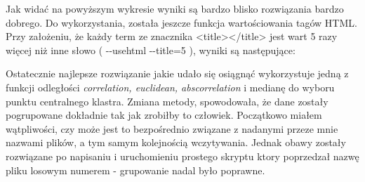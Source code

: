 \documentclass{article}
\begin{document}
\begin{center}
\end{center}

Jak widać na powyższym wykresie wyniki są bardzo blisko rozwiązania bardzo dobrego. Do wykorzystania, została jeszcze funkcja wartościowania tagów HTML. Przy założeniu, że każdy term ze znacznika <title></title> jest wart 5 razy więcej niż inne słowo ( -{}-usehtml -{}-title=5 ), wyniki są następujące:

\begin{center}
\end{center}

Ostatecznie najlepsze rozwiązanie jakie udało się osiągnąć wykorzystuje jedną z funkcji odległości \emph{correlation, euclidean, abscorrelation} i medianę do wyboru punktu centralnego klastra. Zmiana metody, spowodowała, że dane zostały pogrupowane dokładnie tak jak zrobiłby to człowiek. Początkowo miałem wątpliwości, czy może jest to bezpośrednio związane z nadanymi przeze mnie nazwami plików, a tym samym kolejnością wczytywania. Jednak obawy zostały rozwiązane po napisaniu i uruchomieniu prostego skryptu ktory poprzedzał nazwę pliku losowym numerem - grupowanie nadal było poprawne.
\end{document}
